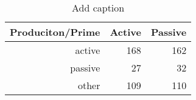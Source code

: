 \begin{table}[htbp]
  \centering
  \caption{Add caption}
    \begin{tabular}{rrr}
    \toprule
    Produciton/Prime & Active & Passive \\
    \midrule
    active & 168   & 162 \\
    passive & 27    & 32 \\
    other & 109   & 110 \\
    \bottomrule
    \end{tabular}%
  \label{tab:addlabel}%
\end{table}%
